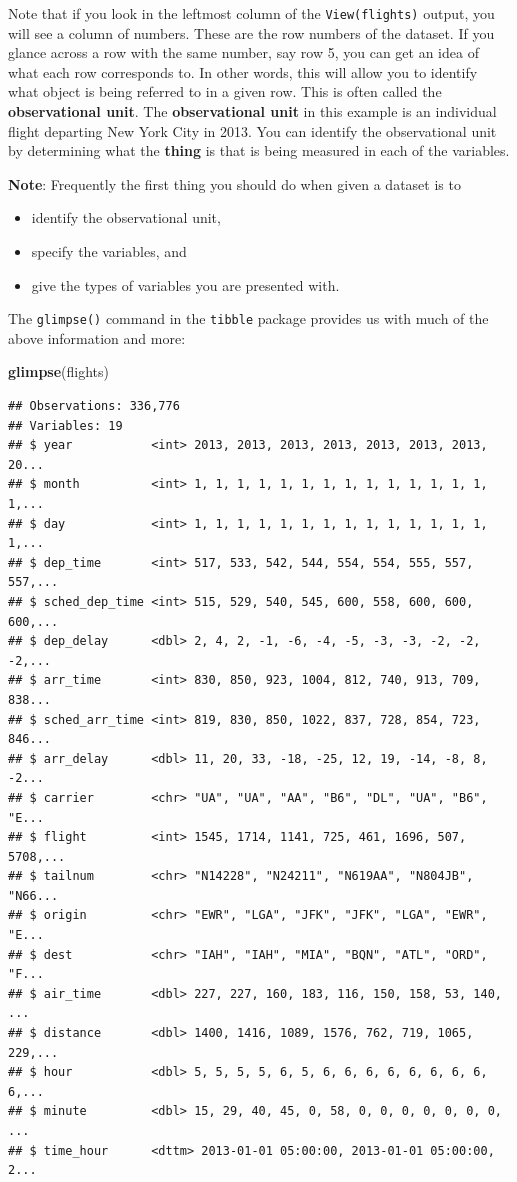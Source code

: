 \documentclass[]{tufte-book}
\newenvironment{Shaded}{\begin{snugshade}}{\end{snugshade}}
\newcommand{\KeywordTok}[1]{\textcolor[rgb]{0.13,0.29,0.53}{\textbf{{#1}}}}
\newcommand{\NormalTok}[1]{{#1}}
\providecommand{\tightlist}{%
  \setlength{\itemsep}{0pt}\setlength{\parskip}{0pt}}
\begin{document}
Note that if you look in the leftmost column of the
\texttt{View(flights)} output, you will see a column of numbers. These
are the row numbers of the dataset. If you glance across a row with the
same number, say row 5, you can get an idea of what each row corresponds
to. In other words, this will allow you to identify what object is being
referred to in a given row. This is often called the
\textbf{observational unit}. The \textbf{observational unit} in this
example is an individual flight departing New York City in 2013. You can
identify the observational unit by determining what the \textbf{thing}
is that is being measured in each of the variables.

\textbf{Note}: Frequently the first thing you should do when given a
dataset is to

\begin{itemize}
\tightlist
\item
  identify the observational unit,
\item
  specify the variables, and
\item
  give the types of variables you are presented with.
\end{itemize}

The \texttt{glimpse()} command in the \texttt{tibble} package provides
us with much of the above information and more:

\begin{Shaded}
\begin{Highlighting}[]
\KeywordTok{glimpse}\NormalTok{(flights)}
\end{Highlighting}
\end{Shaded}

\begin{verbatim}
## Observations: 336,776
## Variables: 19
## $ year           <int> 2013, 2013, 2013, 2013, 2013, 2013, 2013, 20...
## $ month          <int> 1, 1, 1, 1, 1, 1, 1, 1, 1, 1, 1, 1, 1, 1, 1,...
## $ day            <int> 1, 1, 1, 1, 1, 1, 1, 1, 1, 1, 1, 1, 1, 1, 1,...
## $ dep_time       <int> 517, 533, 542, 544, 554, 554, 555, 557, 557,...
## $ sched_dep_time <int> 515, 529, 540, 545, 600, 558, 600, 600, 600,...
## $ dep_delay      <dbl> 2, 4, 2, -1, -6, -4, -5, -3, -3, -2, -2, -2,...
## $ arr_time       <int> 830, 850, 923, 1004, 812, 740, 913, 709, 838...
## $ sched_arr_time <int> 819, 830, 850, 1022, 837, 728, 854, 723, 846...
## $ arr_delay      <dbl> 11, 20, 33, -18, -25, 12, 19, -14, -8, 8, -2...
## $ carrier        <chr> "UA", "UA", "AA", "B6", "DL", "UA", "B6", "E...
## $ flight         <int> 1545, 1714, 1141, 725, 461, 1696, 507, 5708,...
## $ tailnum        <chr> "N14228", "N24211", "N619AA", "N804JB", "N66...
## $ origin         <chr> "EWR", "LGA", "JFK", "JFK", "LGA", "EWR", "E...
## $ dest           <chr> "IAH", "IAH", "MIA", "BQN", "ATL", "ORD", "F...
## $ air_time       <dbl> 227, 227, 160, 183, 116, 150, 158, 53, 140, ...
## $ distance       <dbl> 1400, 1416, 1089, 1576, 762, 719, 1065, 229,...
## $ hour           <dbl> 5, 5, 5, 5, 6, 5, 6, 6, 6, 6, 6, 6, 6, 6, 6,...
## $ minute         <dbl> 15, 29, 40, 45, 0, 58, 0, 0, 0, 0, 0, 0, 0, ...
## $ time_hour      <dttm> 2013-01-01 05:00:00, 2013-01-01 05:00:00, 2...
\end{verbatim}
\end{document}
